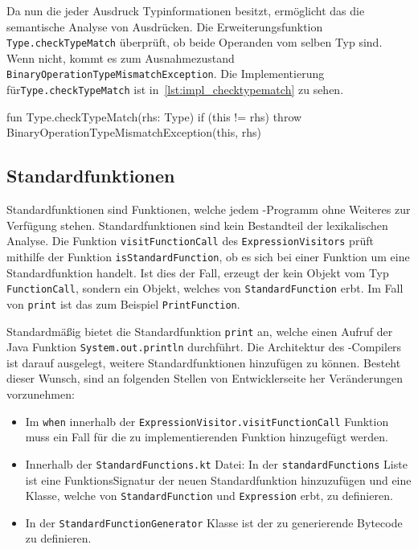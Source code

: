 Da nun die jeder Ausdruck Typinformationen besitzt, ermöglicht das die semantische Analyse von Ausdrücken. Die Erweiterungsfunktion \texttt{Type.checkTypeMatch} überprüft, ob beide Operanden vom selben Typ sind. Wenn nicht, kommt es zum Ausnahmezustand \texttt{BinaryOperationTypeMismatchException}. Die Implementierung für\break \texttt{Type.checkTypeMatch} ist in~\autoref{lst:impl_checktypematch} zu sehen.

\begin{KotlinCode}[numbers=none, caption={Methode zur Überprüfung, dass Operanden übereinstimmende Typen haben}, label=lst:impl_checktypematch]
fun Type.checkTypeMatch(rhs: Type) {
    if (this != rhs) throw BinaryOperationTypeMismatchException(this, rhs)
}    
\end{KotlinCode}

\subsection{Standardfunktionen}

Standardfunktionen sind Funktionen, welche jedem \toya-Programm ohne Weiteres zur Verfügung stehen. Standardfunktionen sind kein Bestandteil der lexikalischen Analyse. Die Funktion \texttt{visitFunctionCall} des \texttt{ExpressionVisitors} prüft mithilfe der Funktion \texttt{isStandardFunction}, ob es sich bei einer Funktion um eine Standardfunktion handelt. Ist dies der Fall, erzeugt der \visitor kein Objekt vom Typ \texttt{FunctionCall}, sondern ein Objekt, welches von \texttt{StandardFunction} erbt. Im Fall von \texttt{print} ist das zum Beispiel \texttt{PrintFunction}.

Standardmäßig bietet \toya die Standardfunktion \texttt{print} an, welche einen Aufruf der Java Funktion \texttt{System.out.println} durchführt. Die Architektur des \toya-Compilers ist darauf ausgelegt, weitere Standardfunktionen hinzufügen zu können. Besteht dieser Wunsch, sind an folgenden Stellen von Entwicklerseite her Veränderungen vorzunehmen:

\begin{itemize}
    \item Im \texttt{when} innerhalb der \texttt{ExpressionVisitor.visitFunctionCall} Funktion muss ein Fall für die zu implementierenden Funktion hinzugefügt werden.
    \item Innerhalb der \texttt{StandardFunctions.kt} Datei: In der \texttt{standardFunctions} Liste ist eine FunktionsSignatur der neuen Standardfunktion hinzuzufügen und eine Klasse, welche von \texttt{StandardFunction} und \texttt{Expression} erbt, zu definieren.
    \item In der \texttt{StandardFunctionGenerator} Klasse ist der zu generierende Bytecode zu definieren.
\end{itemize}

